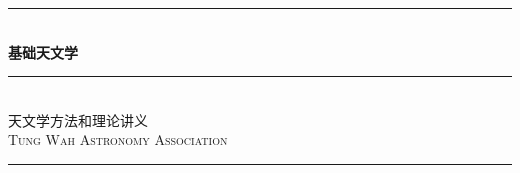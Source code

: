 \documentclass[12pt]{article}
\begin{document}
\begin{titlepage} 
	\newcommand{\HRule}{\rule{\linewidth}{1mm}} %
	
	\center %
	
	\HRule\\[0.35cm]

	{\Huge\bfseries\heiti 基础天文学}%
	
	\HRule\\[0.1cm]

	{\large\fangsong 天文学方法和理论讲义}\\[1.5cm]
	
	
	\textsc{\large Tung Wah Astronomy Association}\\[1cm] %

	

	\vfill\vfill\vfill 
		\bf{}
		\rule{\linewidth}{0.7mm}
	
	

\end{titlepage}
\end{document}
